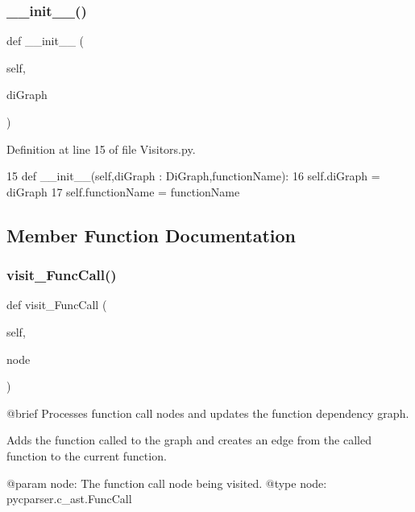 \subsubsection{\texorpdfstring{\+\_\+\+\_\+init\+\_\+\+\_\+()}{\_\_init\_\_()}}
{\footnotesize\ttfamily def \+\_\+\+\_\+init\+\_\+\+\_\+ (\begin{DoxyParamCaption}\item[{}]{self,  }\item[{}]{di\+Graph }\end{DoxyParamCaption})}



Definition at line 15 of file Visitors.\+py.


\begin{DoxyCode}
15     \textcolor{keyword}{def }\_\_init\_\_(self,diGraph : DiGraph,functionName):
16         self.diGraph = diGraph
17         self.functionName = functionName
\end{DoxyCode}


\subsection{Member Function Documentation}
\mbox{\label{classVisitors_1_1FunctionVisitor_a48e7baeee3968db14598ff72b6be63bd}} 
\subsubsection{\texorpdfstring{visit\+\_\+\+Func\+Call()}{visit\_FuncCall()}}
{\footnotesize\ttfamily def visit\+\_\+\+Func\+Call (\begin{DoxyParamCaption}\item[{}]{self,  }\item[{}]{node }\end{DoxyParamCaption})}

\begin{DoxyVerb}@brief Processes function call nodes and updates the function dependency graph.

Adds the function called to the graph and creates an edge from the called function to the current function.

@param node: The function call node being visited.
@type node: pycparser.c_ast.FuncCall
\end{DoxyVerb}
 

